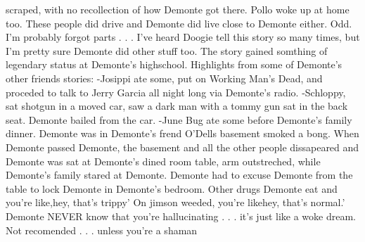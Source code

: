 \documentclass[12pt]{book}
\begin{document}
scraped, with no recollection of how Demonte got there. Pollo woke up at home too. These people did drive and Demonte did live close to Demonte either. Odd. I'm probably forgot parts . . .  I've heard Doogie tell this story so many times, but I'm pretty sure Demonte did other stuff too. The story gained somthing of legendary status at Demonte's highschool. Highlights from some of Demonte's other friends stories: -Josippi ate some, put on Working Man's Dead, and proceded to talk to Jerry Garcia all night long via Demonte's radio. -Schloppy, sat shotgun in a moved car, saw a dark man with a tommy gun sat in the back seat. Demonte bailed from the car. -June Bug ate some before Demonte's family dinner. Demonte was in Demonte's frend O'Dells basement smoked a bong. When Demonte passed Demonte, the basement and all the other people dissapeared and Demonte was sat at Demonte's dined room table, arm outstreched, while Demonte's family stared at Demonte. Demonte had to excuse Demonte from the table to lock Demonte in Demonte's bedroom. Other drugs Demonte eat and you're like,hey, that's trippy' On jimson weeded, you're likehey, that's normal.' Demonte NEVER know that you're hallucinating . . .  it's just like a woke dream. Not recomended . . .  unless you're a shaman
\end{document}
